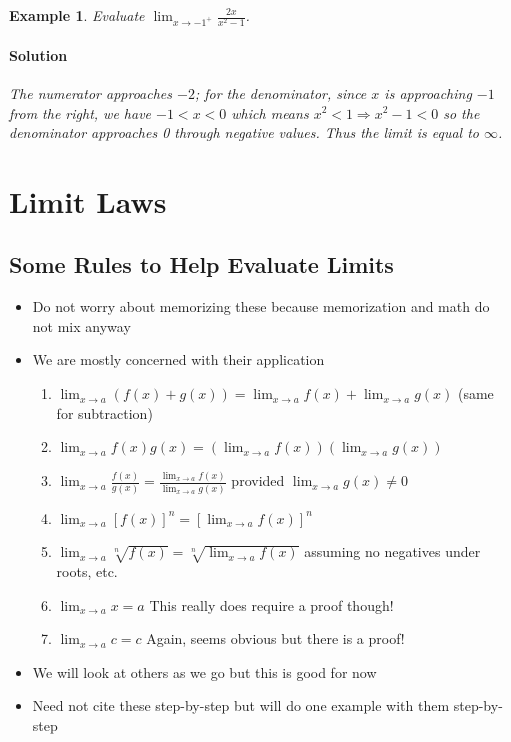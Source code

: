 \documentclass[letterpaper, 11pt, openany]{book}
\theoremstyle{mytheoremstyle}
\theoremstyle{myexamplestyle}
\newtheorem{example}{Example}[section]
\newenvironment{solution}{\paragraph{\sffamily \smaller \fontseries{b}\selectfont Solution}}{\hfill\faSquare}
\begin{document}
\begin{example}\label{e:inf-limit-one-side-2}
    Evaluate \( \displaystyle \lim_{x \to -1^{+}} \frac{2x}{x^{2} - 1} \).
    \begin{solution}
        The numerator approaches \(-2\); for the denominator, since \(x\) is approaching \( -1\) from the right, we have \(-1 < x < 0\) which means \(x^{2} < 1 \Rightarrow x^{2} - 1 < 0\) so the denominator approaches 0 through negative values. Thus the limit is equal to \(\infty\).
    \end{solution}
\end{example}

\section{Limit Laws}
\setcounter{figure}{0}

\subsection{Some Rules to Help Evaluate Limits}
\begin{itemize}
    \item Do not worry about memorizing these because memorization and math do not mix anyway
    \item We are mostly concerned with their application
    \begin{enumerate}
        \item $\displaystyle \lim_{x \to a} (f(x) + g(x)) = \lim_{x \to a} f(x) + \lim_{x \to a} g(x)$ (same for subtraction)
        \item $\displaystyle \lim_{x \to a} f(x)g(x) = \left( \lim_{x \to a} f(x) \right) \left( \lim_{x \to a} g(x) \right)$
        \item $\displaystyle \lim_{x \to a} \frac{f(x)}{g(x)} = \frac{\displaystyle \lim_{x \to a} f(x)}{\displaystyle \lim_{x \to a} g(x)}$ provided $\displaystyle \lim_{x \to a} g(x) \neq 0$
        \item $\displaystyle \lim_{x \to a} \left[ f(x) \right]^{n} = \left[ \lim_{x \to a} f(x) \right]^{n}$
        \item $\displaystyle \lim_{x\to a} \sqrt[n]{f(x)}  = \sqrt[n]{\lim_{x\to a} f(x)}$ assuming no negatives under roots, etc.
        \item $\displaystyle \lim_{x\to a} x = a$ \faMeh \; This really does require a proof though!
        \item $\displaystyle \lim_{x\to a} c = c$ \faMeh \; Again, seems obvious but there is a proof!
    \end{enumerate}
    \item We will look at others as we go but this is good for now
    \item Need not cite these step-by-step but will do one example with them step-by-step
\end{itemize}
\end{document}
